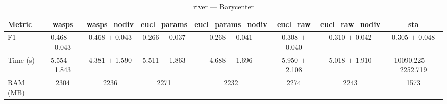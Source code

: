\begin{table}[htbp]
\centering
\begin{NiceTabular}{lccccccc}
\toprule
Metric & wasps & wasps\_nodiv & eucl\_params & eucl\_params\_nodiv & eucl\_raw & eucl\_raw\_nodiv & sta \\
\midrule
F1 & 0.468 $\pm$ 0.043 & 0.468 $\pm$ 0.043 & 0.266 $\pm$ 0.037 & 0.268 $\pm$ 0.041 & 0.308 $\pm$ 0.040 & 0.310 $\pm$ 0.042 & 0.305 $\pm$ 0.048 \\
Time (s) & 5.554 $\pm$ 1.843 & 4.381 $\pm$ 1.590 & 5.511 $\pm$ 1.863 & 4.688 $\pm$ 1.696 & 5.950 $\pm$ 2.108 & 5.018 $\pm$ 1.910 & 10090.225 $\pm$ 2252.719 \\
RAM (MB) & 2304 & 2236 & 2271 & 2232 & 2274 & 2243 & 1573 \\
\bottomrule
\end{NiceTabular}
\caption{river --- Barycenter}
\label{tab:exp1bis_river_barycenter}
\end{table}
